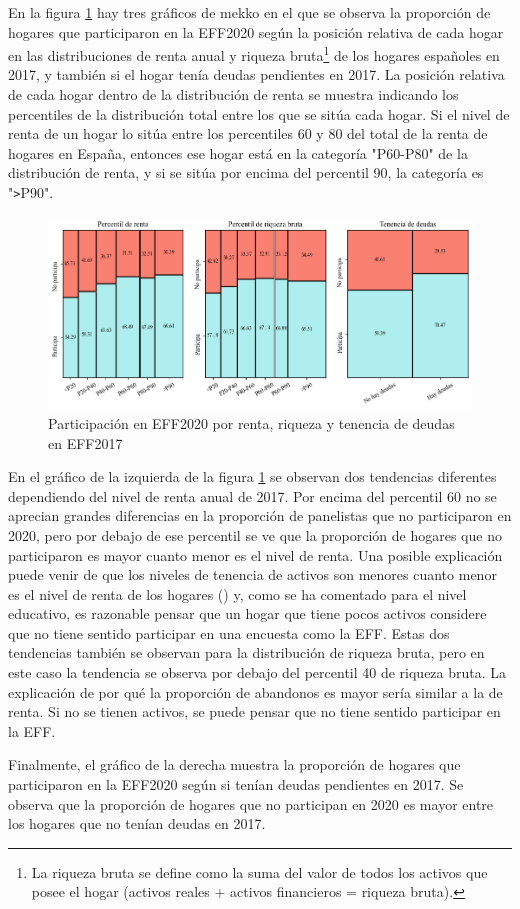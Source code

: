 En la figura \ref{fig:fig3} hay tres gráficos de mekko en el que se observa la proporción de hogares que participaron en la EFF2020 según la posición relativa de cada hogar en las distribuciones de renta anual y riqueza bruta\footnote{La riqueza bruta se define como la suma del valor de todos los activos que posee el hogar (activos reales + activos financieros = riqueza bruta).} de los hogares españoles en 2017, y también si el hogar tenía deudas pendientes en 2017. La posición relativa de cada hogar dentro de la distribución de renta se muestra indicando los percentiles de la distribución total entre los que se sitúa cada hogar. Si el nivel de renta de un hogar lo sitúa entre los percentiles 60 y 80 del total de la renta de hogares en España, entonces ese hogar está en la categoría "P60-P80" de la distribución de renta, y si se sitúa por encima del percentil 90, la categoría es "\verb|>|P90".

\begin{figure}[ht]
	\centering
	\includegraphics[width=1\textwidth]{figs/figure3.png}
	\caption{Participación en EFF2020 por renta, riqueza y tenencia de deudas en EFF2017}
	\label{fig:fig3}
\end{figure}

En el gráfico de la izquierda de la figura \ref{fig:fig3} se observan dos tendencias diferentes dependiendo del nivel de renta anual de 2017. Por encima del percentil 60 no se aprecian grandes diferencias en la proporción de panelistas que no participaron en 2020, pero por debajo de ese percentil se ve que la proporción de hogares que no participaron es mayor cuanto menor es el nivel de renta. Una posible explicación puede venir de que los niveles de tenencia de activos son menores cuanto menor es el nivel de renta de los hogares (\cite{eff2017results}) y, como se ha comentado para el nivel educativo, es razonable pensar que un hogar que tiene pocos activos considere que no tiene sentido participar en una encuesta como la EFF. Estas dos tendencias también se observan para la distribución de riqueza bruta, pero en este caso la tendencia se observa por debajo del percentil 40 de riqueza bruta. La explicación de por qué la proporción de abandonos es mayor sería similar a la de renta. Si no se tienen activos, se puede pensar que no tiene sentido participar en la EFF.

Finalmente, el gráfico de la derecha muestra la proporción de hogares que participaron en la EFF2020 según si tenían deudas pendientes en 2017. Se observa que la proporción de hogares que no participan en 2020 es mayor entre los hogares que no tenían  deudas en 2017.